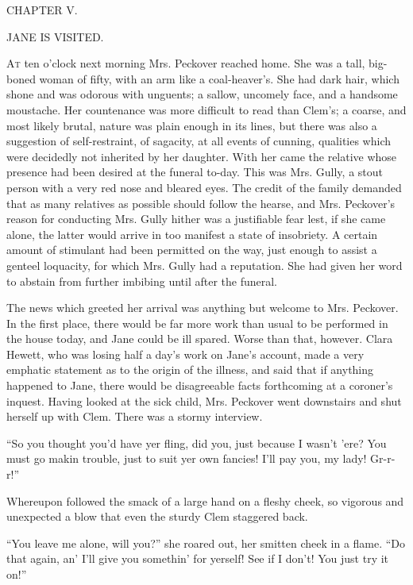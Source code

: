 {}

{CHAPTER V.}

JANE IS VISITED.

\textsc{At} ten o'clock next morning Mrs. Peckover reached home. She was
a tall, big-boned woman of fifty, with an arm like a coal-heaver's. She
had dark hair, which shone and was odorous with unguents; a sallow,
uncomely face, and a handsome moustache. Her countenance was more
difficult to read than Clem's; a coarse, and most likely brutal, nature
was plain enough in its lines, but there was also a suggestion of
self-restraint, of sagacity, at all events of cunning, qualities which
were decidedly not inherited by her daughter. With her came the relative
whose presence had been desired at the funeral to-day. This was Mrs.
Gully, a stout person with a very red nose and bleared eyes. The
{}credit of the family demanded that as many relatives as possible
should follow the hearse, and Mrs. Peckover's reason for conducting Mrs.
Gully hither was a justifiable fear lest, if she came alone, the latter
would arrive in too manifest a state of insobriety. A certain amount of
stimulant had been permitted on the way, just enough to assist a genteel
loquacity, for which Mrs. Gully had a reputation. She had given her word
to abstain from further imbibing until after the funeral.

The news which greeted her arrival was anything but welcome to Mrs.
Peckover. In the first place, there would be far more work than usual to
be performed in the house today, and Jane could be ill spared. Worse
than that, however. Clara Hewett, who was losing half a day's work on
Jane's account, made a very emphatic statement as to the origin of the
illness, and said that if anything happened to Jane, there would be
disagreeable facts forthcoming at a coroner's inquest. Having looked at
the sick child, Mrs. Peckover went downstairs and shut {}herself up with
Clem. There was a stormy interview.

``So you thought you'd have yer fling, did you, just because I wasn't
'ere? You must go makin trouble, just to suit yer own fancies! I'll pay
you, my lady! Gr-r-r!''

Whereupon followed the smack of a large hand on a fleshy cheek, so
vigorous and unexpected a blow that even the sturdy Clem staggered back.

``You leave me alone, will you?'' she roared out, her smitten cheek in a
flame. ``Do that again, an' I'll give you somethin' for yerself! See if
I don't! You just try it on!''

